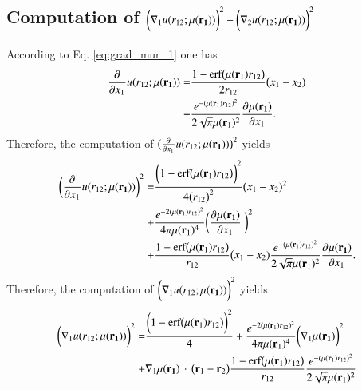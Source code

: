 \documentclass[aip,jcp,reprint,noshowkeys,superscriptaddress]{revtex4-1}
\newcommand{\deriv}[3]{\frac{\partial^{#3} #1}{\partial {#2}^{#3}}}
\newcommand{\br}[0]{{\bf {r}}}
\newcommand{\bri}[1]{{\bf r}_{#1}}
\newcommand{\mur}[1]{\mu({\bf r_{#1}})}
\begin{document}
\subsection{Computation of $\bigg( \nabla_1  u(r_{12};\mur{1})\bigg)^2 + \bigg( \nabla_2  u(r_{12};\mur{1})\bigg)^2$ }
According to Eq. \eqref{eq:grad_mur_1} one has 
\begin{equation}
 \begin{aligned}
 \deriv{}{x_1}{} u(r_{12};\mur{1}) =& \frac{1 - \text{erf}\big(\mu(\bri{1}) r_{12} \big)}{2 r_{12}}\big( x_1 - x_2) \\
                                   +&\frac{e^{-(\mu(\bri{1}) r_{12})^2}}{2 \sqrt{\pi} \mu(\bri{1})^2} \deriv{\mur{1}}{x_1}{}.  
 \end{aligned}
\end{equation}
Therefore, the computation of $\big( \deriv{}{x_1}{} u(r_{12};\mur{1}) \big)^2$ yields 
\begin{equation}
 \begin{aligned}
 \bigg( \deriv{}{x_1}{} u(r_{12};\mur{1}) \bigg)^2 = & \frac{\bigg(1 - \text{erf}\big(\mu(\bri{1}) r_{12} \big)\bigg)^2}{4 \big(r_{12}\big)^2}\big( x_1 - x_2)^2 \\
 + & \frac{e^{-2(\mu(\bri{1}) r_{12})^2}}{4 \pi \mu(\bri{1})^4} \bigg(\deriv{\mur{1}}{x_1}{} \bigg)^2 \\ 
 + & \frac{1 - \text{erf}\big(\mu(\bri{1}) r_{12} \big)}{r_{12}}\big( x_1 - x_2) \frac{e^{-(\mu(\bri{1}) r_{12})^2}}{2 \sqrt{\pi} \mu(\bri{1})^2} \deriv{\mur{1}}{x_1}{}.
 \end{aligned}
\end{equation}
Therefore, the computation of $\bigg( \nabla_1  u(r_{12};\mur{1})\bigg)^2$ yields 
\begin{equation}
 \begin{aligned}
  \bigg( \nabla_1  u(r_{12};\mur{1})\bigg)^2  = &\frac{\bigg(1 - \text{erf}\big(\mu(\bri{1}) r_{12} \big)\bigg)^2}{4} 
   +   \frac{e^{-2(\mu(\bri{1}) r_{12})^2}}{4 \pi \mu(\bri{1})^4} \bigg( \nabla_1  \mur{1}\bigg)^2 \\ 
   + & \nabla_1  \mur{1} \, \cdot \, \big( \br{}_1 - \br{}_2\big) \frac{1 - \text{erf}\big(\mu(\bri{1}) r_{12} \big)}{r_{12}} \frac{e^{-(\mu(\bri{1}) r_{12})^2}}{2 \sqrt{\pi}\mu(\bri{1})^2} 
 \end{aligned}
\end{equation}
\end{document}
